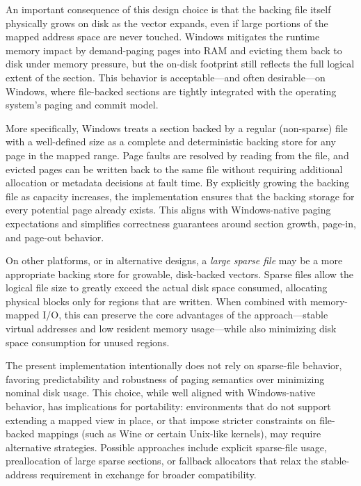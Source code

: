 An important consequence of this design choice is that the backing file itself
physically grows on disk as the vector expands, even if large portions of the
mapped address space are never touched. Windows mitigates the runtime memory
impact by demand-paging pages into RAM and evicting them back to disk under
memory pressure, but the on-disk footprint still reflects the full logical extent
of the section. This behavior is acceptable—and often desirable—on Windows,
where file-backed sections are tightly integrated with the operating system's
paging and commit model.

More specifically, Windows treats a section backed by a regular (non-sparse)
file with a well-defined size as a complete and deterministic backing store for
any page in the mapped range. Page faults are resolved by reading from the file,
and evicted pages can be written back to the same file without requiring
additional allocation or metadata decisions at fault time. By explicitly
growing the backing file as capacity increases, the implementation ensures that
the backing storage for every potential page already exists. This aligns with
Windows-native paging expectations and simplifies correctness guarantees around
section growth, page-in, and page-out behavior.

On other platforms, or in alternative designs, a \emph{large sparse file} may be
a more appropriate backing store for growable, disk-backed vectors. Sparse files
allow the logical file size to greatly exceed the actual disk space consumed,
allocating physical blocks only for regions that are written. When combined with
memory-mapped I/O, this can preserve the core advantages of the approach—stable
virtual addresses and low resident memory usage—while also minimizing disk space
consumption for unused regions.

The present implementation intentionally does not rely on sparse-file behavior,
favoring predictability and robustness of paging semantics over minimizing
nominal disk usage. This choice, while well aligned with Windows-native behavior,
has implications for portability: environments that do not support extending a
mapped view in place, or that impose stricter constraints on file-backed mappings
(such as Wine or certain Unix-like kernels), may require alternative strategies.
Possible approaches include explicit sparse-file usage, preallocation of large
sparse sections, or fallback allocators that relax the stable-address requirement
in exchange for broader compatibility.



